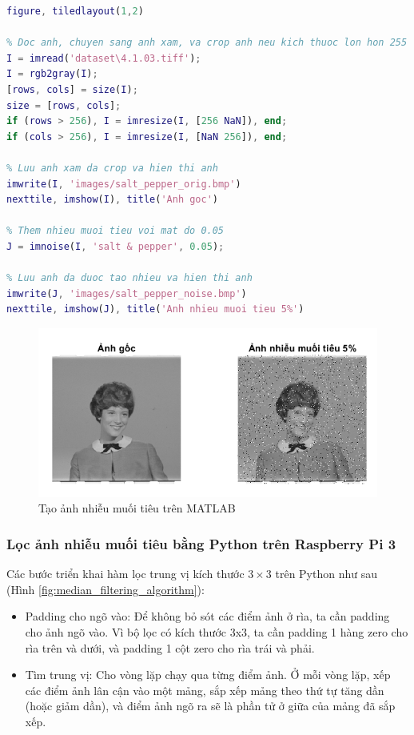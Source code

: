 \begin{lstlisting}[language=MATLAB]
figure, tiledlayout(1,2)

% Doc anh, chuyen sang anh xam, va crop anh neu kich thuoc lon hon 255
I = imread('dataset\4.1.03.tiff');
I = rgb2gray(I);
[rows, cols] = size(I);
size = [rows, cols];
if (rows > 256), I = imresize(I, [256 NaN]), end;
if (cols > 256), I = imresize(I, [NaN 256]), end;

% Luu anh xam da crop va hien thi anh
imwrite(I, 'images/salt_pepper_orig.bmp')
nexttile, imshow(I), title('Anh goc')

% Them nhieu muoi tieu voi mat do 0.05
J = imnoise(I, 'salt & pepper', 0.05);

% Luu anh da duoc tao nhieu va hien thi anh
imwrite(J, 'images/salt_pepper_noise.bmp')
nexttile, imshow(J), title('Anh nhieu muoi tieu 5%')
\end{lstlisting}

\begin{figure}[H]
    \centering
    \includegraphics[width=1\linewidth]{images/salt_pepper_noise_matlab.png}
    \caption{Tạo ảnh nhiễu muối tiêu trên MATLAB}
\end{figure}

\subsubsection{Lọc ảnh nhiễu muối tiêu bằng Python trên Raspberry Pi 3}

Các bước triển khai hàm lọc trung vị kích thước $3 \times 3$ trên Python như sau (Hình \ref{fig:median_filtering_algorithm}):

\begin{itemize}
    \item Padding cho ngõ vào: Để không bỏ sót các điểm ảnh ở rìa, ta cần padding cho ảnh ngõ vào. Vì bộ lọc có kích thước 3x3, ta cần padding 1 hàng zero cho rìa trên và dưới, và padding 1 cột zero cho rìa trái và phải.

    \item Tìm trung vị: Cho vòng lặp chạy qua từng điểm ảnh. Ở mỗi vòng lặp, xếp các điểm ảnh lân cận vào một mảng, sắp xếp mảng theo thứ tự tăng dần (hoặc giảm dần), và điểm ảnh ngõ ra sẽ là phần tử ở giữa của mảng đã sắp xếp.
\end{itemize}

